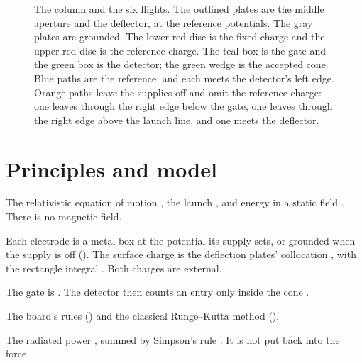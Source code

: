 \documentclass{leveldoc}
\begin{document}
\begin{figure}[ht]
\caption{The column and the six flights. The outlined plates are the middle
aperture and the deflector, at the reference potentials. The gray plates are
grounded. The lower red disc is the fixed charge and the upper red disc is
the reference charge. The teal box is the gate and the green box is the
detector; the green wedge is the accepted cone. Blue paths are the reference,
and each meets the detector's left edge. Orange paths leave the supplies off
and omit the reference charge: one leaves through the right edge below the
gate, one leaves through the right edge above the launch line, and one meets
the deflector.}
\label{fig:board}
\end{figure}

\section{Principles and model}\label{sec:model}

\begin{principles}
  \item The relativistic equation of motion , the
    launch , and energy in a static field
    . There is no magnetic field.
  \item Each electrode is a metal box at the potential its supply sets, or
    grounded when the supply is off (). The surface charge is
    the deflection plates' collocation
    , with the rectangle integral
    . Both charges are external.
  \item The gate is . The detector then counts an
    entry only inside the cone .
  \item The board's rules () and the classical
    Runge--Kutta method ().
  \item The radiated power , summed by Simpson's
    rule . It is not put back into the force.
\end{principles}
\end{document}
